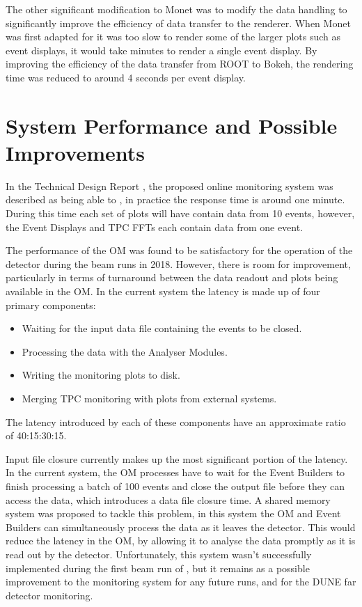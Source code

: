 The other significant modification to Monet was to modify the data handling to 
significantly improve the efficiency of data transfer to the renderer.
When Monet was first adapted for \protodune{} it was too slow to render some 
of the larger plots such as event displays, it would take minutes to render a 
single event display. By improving the efficiency of the data transfer from ROOT
to Bokeh, the rendering time was reduced to around 4 seconds per event display.

\section{System Performance and Possible Improvements}
In the \protodune{} Technical Design Report \cite{Abi2017}, the proposed online
monitoring system was described as being able to , in practice the response time is around one minute.
During this time each set of plots will have contain data from 10 events, 
however, the Event Displays and TPC FFTs each contain data from one event.

The performance of the OM was found to be satisfactory for the operation of the
\protodune{} detector during the beam runs in 2018. However, there is room for
improvement, particularly in terms of turnaround between the data readout and
plots being available in the OM. In the current system the latency is made up 
of four primary components:
\begin{itemize}
	\item Waiting for the input data file containing the events to be closed.
	\item Processing the data with the Analyser Modules.
	\item Writing the monitoring plots to disk.
	\item Merging TPC monitoring with plots from external systems.
\end{itemize}
The latency introduced by each of these components have an approximate ratio of 
40:15:30:15. 

Input file closure currently makes up the most significant portion 
of the latency. In the current system, the OM processes have to wait for the 
Event Builders to finish processing a batch of 100 events and close the output 
file before they can access the data, which introduces a data file closure 
time. A shared memory system was proposed to tackle this problem, in this 
system the OM and Event Builders can simultaneously process the data as it 
leaves the detector.  This would reduce the latency in the OM, by allowing it 
to analyse the data promptly as it is read out by the detector. Unfortunately, 
this system wasn't successfully implemented during the first beam run of 
\protodune{}, but it remains as a possible improvement to the monitoring 
system for any future \protodune{} runs, and for the DUNE far detector 
monitoring.

